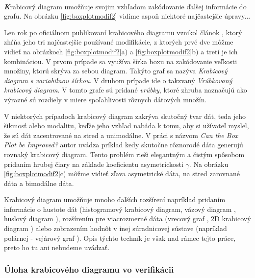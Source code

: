 \paragraph{}
{\large \textbf{\textit{K}}}rabicový diagram umožňuje svojim vzhľadom zakódovanie ďalšej informácie do grafu. Na obrázku \ref{fig:boxplotmodif2} vidíme aspoň niektoré najčastejšie úpravy... %

Len rok po oficiálnom publikovaní krabicového diagramu vznikol článok \cite{McGill}, ktorý zhŕňa jeho tri najčastejšie používané modifikácie, z ktorých prvé dve môžme vidieť na obrázkoch \ref{fig:boxplotmodif2}a) a \ref{fig:boxplotmodif2}b) a tretí je ich kombináciou. V prvom prípade sa využíva šírka boxu na zakódovanie veľkosti množiny, ktorú skrýva za sebou diagram. Takýto graf sa nazýva \textit{Krabicový diagram s variabilnou šírkou}.  
V druhom prípade ide o takzvaný \textit{Vrúbkovaný krabicový diagram}. V tomto grafe sú pridané \textit{vrúbky}, ktoré zhruba naznačujú ako výrazné sú rozdiely v miere spoľahlivosti rôznych dátových množín. 

V niektorých prípadoch krabicový diagram zakrýva skutočný tvar dát, teda jeho šikmosť alebo modalitu, keďže jeho vzhľad nabáda k tomu, aby si užívateľ myslel, že sú dát zacentrované na stred a unimodálne. V práci s názvom \textit{Can the Box Plot be Improved?} \cite{Chamnein} autor uvádza príklad kedy skutočne rôznorodé dáta generujú rovnaký krabicový diagram. Tento problém rieši elegantným a čistým spôsobom pridaním hrubej čiary na základe koeficientu asymetrickosti $ \gamma $. Na obrázku \ref{fig:boxplotmodif2}c) môžme vidieť zľava asymetrické dáta, na stred zarovnané dáta a bimodálne dáta.

Krabicový diagram umožňuje mnoho ďalších rozšírení napríklad pridaním informácie o hustote dát (histogramový krabicový diagram, vázový diagram \cite{HistVasePlot} , huslový diagram \cite{ViolinPlot}), rozšírením pre viacrozmerné dáta (vrecový graf \cite{Bagplot}, 2D krabicový diagram \cite{Boxplot2D} ) alebo zobrazením hodnôt v inej súradnicovej sústave (napríklad polárnej - vejárový graf \cite{FanChart}). Opis týchto techník je však nad rámec tejto práce, preto ho tu ani nebudeme uvádzať.

\subsubsection{Úloha krabicového diagramu vo verifikácii}

